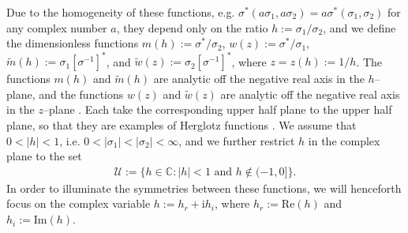 \documentclass[english,12pt,jmp,graphicx]{revtex4-1}
\newcommand{\I}{\mathrm{i}}
\begin{document}
Due to the homogeneity of these functions, e.g.
$\sigma^*(a\sigma_1,a\sigma_2)=a\sigma^*(\sigma_1,\sigma_2)$ for any complex number $a$,
they depend only on the ratio $h:=\sigma_1/\sigma_2$, and we define the
dimensionless functions $m(h):=\sigma^*/\sigma_2$, $w(z):=\sigma^*/\sigma_1$,
$\tilde{m}(h):=\sigma_1[\sigma^{-1}]^*$, and $\tilde{w}(z):=\sigma_2[\sigma^{-1}]^*$, where 
$z=z(h):=1/h$. The functions $m(h)$ and $\tilde{m}(h)$ are analytic off the
negative real axis in the $h$--plane, and the functions $w(z)$ and
$\tilde{w}(z)$ are analytic off the negative real axis in the
$z$--plane \cite{Golden:CMP-473}. Each take the corresponding upper
half plane to the upper half plane, so that they are examples of 
Herglotz functions \cite{Golden:CMP-473}. We assume that $0<|h|<1$,
i.e. $0<|\sigma_1|<|\sigma_2|<\infty$, and we further restrict $h$ in the complex
plane to the set
%
\begin{align}\label{eq:h_Domain}
  \mathcal{U}:=\{h\in\mathbb{C}: |h|<1 \text{ and } h\not\in(-1,0]\}.
\end{align}
%
In order to illuminate the symmetries between these functions, we will henceforth
focus on the complex variable $h:=h_r+\I h_i$, where
$h_r:=\text{Re}(h)$ and $h_i:=\text{Im}(h)$.
\end{document}
